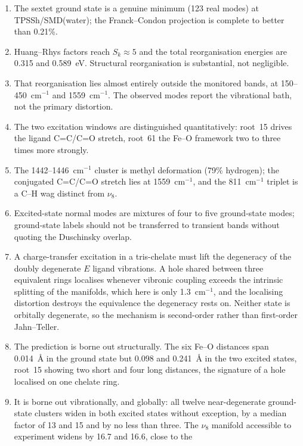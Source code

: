 \documentclass[11pt,a4paper]{article}
\newcommand{\wn}{\ensuremath{\mathrm{cm^{-1}}}}
\begin{document}
\begin{enumerate}
\item The sextet ground state is a genuine minimum (123 real modes) at
      TPSSh/SMD(water); the Franck--Condon projection is complete to better
      than 0.21\%.
\item Huang--Rhys factors reach $S_k \approx 5$ and the total reorganisation
      energies are 0.315 and 0.589~eV. Structural reorganisation is
      substantial, not negligible.
\item That reorganisation lies almost entirely outside the monitored bands, at
      150--450~\wn{} and 1559~\wn{}. The observed modes report the vibrational
      bath, not the primary distortion.
\item The two excitation windows are distinguished quantitatively: root~15
      drives the ligand C=C/C=O stretch, root~61 the Fe--O framework two to
      three times more strongly.
\item The 1442--1446~\wn{} cluster is methyl deformation (79\% hydrogen);
      the conjugated C=C/C=O stretch lies at 1559~\wn{}, and the 811~\wn{}
      triplet is a C--H wag distinct from $\nu_8$.
\item Excited-state normal modes are mixtures of four to five ground-state
      modes; ground-state labels should not be transferred to transient bands
      without quoting the Duschinsky overlap.
\item A charge-transfer excitation in a tris-chelate must lift the degeneracy
      of the doubly degenerate $E$ ligand vibrations. A hole shared between
      three equivalent rings localises whenever vibronic coupling exceeds the
      intrinsic splitting of the manifolds, which here is only 1.3~\wn{}, and
      the localising distortion destroys the equivalence the degeneracy rests
      on. Neither state is orbitally degenerate, so the mechanism is
      second-order rather than first-order Jahn--Teller.
\item The prediction is borne out structurally. The six Fe--O distances span
      0.014~\AA{} in the ground state but 0.098 and 0.241~\AA{} in the two
      excited states, root~15 showing two short and four long distances, the
      signature of a hole localised on one chelate ring.
\item It is borne out vibrationally, and globally: all twelve near-degenerate
      ground-state clusters widen in both excited states without exception,
      by a median factor of 13 and 15 and by no less than three. The $\nu_8$
      manifold accessible to experiment widens by 16.7 and 16.6, close to the

\end{enumerate}
\end{document}
